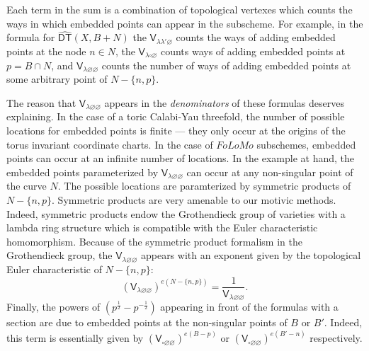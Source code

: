 \documentclass[12pt]{amsart}
\newcommand{\Vsf}{\mathsf{V}}
\newcommand{\bx}{\square}
\renewcommand{\emptyset}{\varnothing}
\newcommand{\half}{\frac{1}{2}}
\theoremstyle{definition}
\newcommand{\DThat}{\operatorname{\widehat{\mathsf{DT}}}}
\newcommand{\folomo}{{FoLoMo }}
\begin{document}
Each term in the sum is a combination of topological vertexes which
counts the ways in which embedded points can appear in the
subscheme. For example, in the formula for $\DThat (X,B+N)$ the
$\Vsf_{\lambda \lambda '\emptyset}$ counts the ways of adding embedded
points at the node $n\in N$, the $\Vsf_{\lambda \bx \emptyset}$ counts
ways of adding embedded points at $p=B\cap N$, and $\Vsf_{\lambda
\emptyset \emptyset}$ counts the number of ways of adding embedded
points at some arbitrary point of $N-\{n,p \}$. 

The reason that $\Vsf_{\lambda \emptyset \emptyset}$ appears in the
\emph{denominators} of these formulas deserves explaining.  In the
case of a toric Calabi-Yau threefold, the number of possible locations
for embedded points is finite --- they only occur at the origins of
the torus invariant coordinate charts. In the case of $\folomo$
subschemes, embedded points can occur at an infinite number of
locations. In the example at hand, the embedded points parameterized
by $\Vsf_{\lambda \emptyset \emptyset}$ can occur at any non-singular
point of the curve $N$. The possible locations are paramterized by
symmetric products of $N-\{n,p \}$.  Symmetric products are very
amenable to our motivic methods. Indeed, symmetric products endow the
Grothendieck group of varieties with a lambda ring structure which is
compatible with the Euler characteristic homomorphism. Because of the symmetric product
formalism in the Grothendieck group, the $\Vsf_{\lambda \emptyset \emptyset}$ appears with an
exponent given by the topological Euler characteristic of $N-\{n,p \}$:
\[
(\Vsf_{\lambda \emptyset \emptyset})^{e(N-\{n,p \})}
=\frac{1}{\Vsf_{\lambda \emptyset \emptyset}} .
\]
Finally, the powers of $\left(p^{\half}-p^{-\half} \right)$ appearing
in front of the formulas with a section are due to embedded points at
the non-singular points of $B$ or $B'$. Indeed, this term is
essentially given by $\left(\Vsf_{\bx \emptyset \emptyset}
\right)^{e(B-p)}$ or $\left(\Vsf_{\bx \emptyset \emptyset}
\right)^{e(B'-n)}$ respectively.
\end{document}

